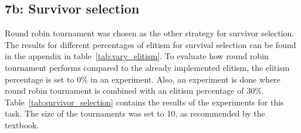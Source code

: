 \documentclass{report}
\begin{document}
\begin{table}[H]
	\centering
	\caption{Results when using Fitness Proportional Selection as parent selection method.}
	\label{tab:selparentfitprop}
\end{table}

\subsection{7b: Survivor selection}
Round robin tournament was chosen as the other strategy for survivor selection. The results for different percentages of elitism for survival selection can be found in the appendix in table~\ref{tab:vary_elitism}. To evaluate how round robin tournament performs compared to the already implemented elitism, the elitism percentage is set to 0\% in an experiment. Also, an experiment is done where round robin tournament is combined with an elitism percentage of 30\%. Table~\ref{tab:survivor_selection} contains the results of the experiments for this task. The size of the tournaments was set to 10, as recommended by the textbook.
\end{document}
